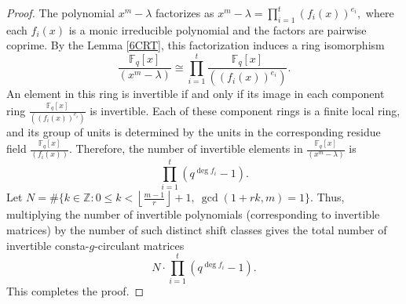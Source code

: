 \documentclass[12pt]{article}
\begin{document}
\begin{proof}
	The polynomial \( x^m - \lambda \) factorizes as 
$
x^m - \lambda = \prod_{i=1}^{t} (f_i(x))^{e_i},
$ where each \( f_i(x) \) is a monic irreducible polynomial and the factors are pairwise coprime. By the Lemma \ref{6CRT}, this factorization induces a ring isomorphism
\[
\frac{\mathbb{F}_q[x]}{( x^m - \lambda )} \cong \prod_{i=1}^{t} \frac{\mathbb{F}_q[x]}{( (f_i(x))^{e_i} )}.
\]
	An element in this ring is invertible if and only if its image in each component ring \( \frac{\mathbb{F}_q[x]}{( (f_i(x))^{e_i} )}  \) is invertible. Each of these component rings is a finite local ring, and its group of units is determined by the units in the corresponding residue field \( \frac{\mathbb{F}_q[x]}{( f_i(x) )} \). Therefore, the number of invertible elements in \( \frac{\mathbb{F}_q[x]}{( x^m - \lambda )} \) is
	\[
	\prod_{i=1}^{t} \left( q^{\deg f_i} - 1 \right).
	\]
	Let $N=\#\{k\in \mathbb{Z}: 0\leq k< \left\lfloor \frac{m - 1}{r} \right\rfloor +1,~\gcd(1+rk,m)=1\}.$
 Thus, multiplying the number of invertible polynomials (corresponding to invertible matrices) by the number of such distinct shift classes gives the total number of invertible consta-\( g \)-circulant matrices
	\[
	N \cdot \prod_{i=1}^{t} \left( q^{\deg f_i} - 1 \right).
	\]
	This completes the proof.
\end{proof}
\end{document}
